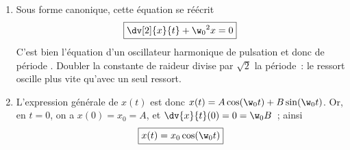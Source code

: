 \documentclass[a4paper, 12pt, final, garamond]{book}
\begin{document}
{\begin{enumerate}
\begin{gather*}
\begin{array}{c}
                        +k(\bcancel{\ell_{\rm eq}} - x -\cancel{\ell_0})\\
                        -mg + R
                    \end{array}
                \right)
            \end{gather*}
            Sur l'axe $\ux$ on trouve
            \begin{equation*}
                \boxed{m \dv[2]{x}{t} + 2kx = 0} \Leftrightarrow \boxed{\dv[2]{x}{t} +
                \frac{2k}{m}x = 0}
            \end{equation*}
            La projection sur $\uy$ montre que la réaction du support compense
            le poids.
        \item Sous forme canonique, cette équation se réécrit
            \begin{equation*}
                \boxed{ \dv[2]{x}{t} + \w_0{}^2x = 0}
            \end{equation*}
            C'est bien l'équation d'un oscillateur harmonique de pulsation
             et donc de période . Doubler la
            constante de raideur divise par $\sqrt{2}$ la période~: le ressort
            oscille plus vite qu'avec un seul ressort.
        \item L'expression générale de $x(t)$ est donc $x(t) = A\cos(\w_0t) +
            B\sin(\w_0t)$. Or, en $t=0$, on a $x(0) = x_0 = A$, et $ \dv{x}{t}
            (0) = 0 = \w_0 B$~; ainsi
            \begin{equation*}
                \boxed{x(t) = x_0\cos(\w_0t)}
            \end{equation*}
    \end{enumerate}
}
\end{document}
